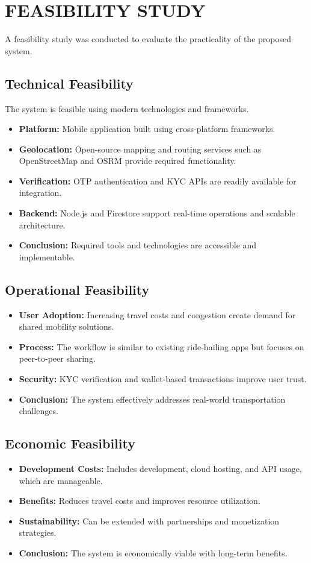 \documentclass[10pt,a4paper]{report}
\begin{document}
\section{\textbf{FEASIBILITY STUDY}}
\large\justify
A feasibility study was conducted to evaluate the practicality of the proposed system.

\subsection{Technical Feasibility}
\large\justify
The system is feasible using modern technologies and frameworks.
\begin{itemize}
    \item \textbf{Platform:} Mobile application built using cross-platform frameworks.
    \item \textbf{Geolocation:} Open-source mapping and routing services such as OpenStreetMap and OSRM provide required functionality.
    \item \textbf{Verification:} OTP authentication and KYC APIs are readily available for integration.
    \item \textbf{Backend:} Node.js and Firestore support real-time operations and scalable architecture.
    \item \textbf{Conclusion:} Required tools and technologies are accessible and implementable.
\end{itemize}

\subsection{Operational Feasibility}
\large\justify
\begin{itemize}
    \item \textbf{User Adoption:} Increasing travel costs and congestion create demand for shared mobility solutions.
    \item \textbf{Process:} The workflow is similar to existing ride-hailing apps but focuses on peer-to-peer sharing.
    \item \textbf{Security:} KYC verification and wallet-based transactions improve user trust.
    \item \textbf{Conclusion:} The system effectively addresses real-world transportation challenges.
\end{itemize}

\subsection{Economic Feasibility}
\begin{itemize}
    \item \textbf{Development Costs:} Includes development, cloud hosting, and API usage, which are manageable.
    \item \textbf{Benefits:} Reduces travel costs and improves resource utilization.
    \item \textbf{Sustainability:} Can be extended with partnerships and monetization strategies.
    \item \textbf{Conclusion:} The system is economically viable with long-term benefits.
\end{itemize}
\end{document}
